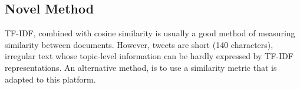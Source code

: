 \documentclass[letterpaper]{article}
\begin{document}





\subsection{Novel Method}
TF-IDF, combined with cosine similarity is usually a good method of measuring similarity between documents. However, tweets are short (140 characters), irregular text whose topic-level information can be hardly expressed by TF-IDF representations. An alternative method, is to use a similarity metric that is adapted to this platform. 
\end{document}
